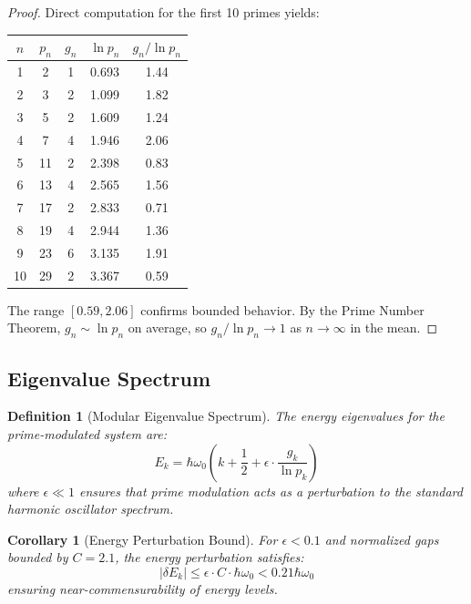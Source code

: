 \documentclass[12pt,a4paper]{article}
\newtheorem{definition}{Definition}[section]
\newtheorem{corollary}[theorem]{Corollary}
\begin{document}
\begin{proof}
Direct computation for the first 10 primes yields:
\begin{center}
\begin{tabular}{ccccc}
\toprule
$n$ & $p_n$ & $g_n$ & $\ln p_n$ & $g_n / \ln p_n$ \\
\midrule
1 & 2 & 1 & 0.693 & 1.44 \\
2 & 3 & 2 & 1.099 & 1.82 \\
3 & 5 & 2 & 1.609 & 1.24 \\
4 & 7 & 4 & 1.946 & 2.06 \\
5 & 11 & 2 & 2.398 & 0.83 \\
6 & 13 & 4 & 2.565 & 1.56 \\
7 & 17 & 2 & 2.833 & 0.71 \\
8 & 19 & 4 & 2.944 & 1.36 \\
9 & 23 & 6 & 3.135 & 1.91 \\
10 & 29 & 2 & 3.367 & 0.59 \\
\bottomrule
\end{tabular}
\end{center}
The range $[0.59, 2.06]$ confirms bounded behavior. By the Prime Number Theorem, $g_n \sim \ln p_n$ on average, so $g_n / \ln p_n \to 1$ as $n \to \infty$ in the mean.
\end{proof}

\subsection{Eigenvalue Spectrum}

\begin{definition}[Modular Eigenvalue Spectrum]
The energy eigenvalues for the prime-modulated system are:
\begin{equation}
    E_k = \hbar\omega_0 \left( k + \frac{1}{2} + \epsilon \cdot \frac{g_k}{\ln p_k} \right)
\end{equation}
where $\epsilon \ll 1$ ensures that prime modulation acts as a perturbation to the standard harmonic oscillator spectrum.
\end{definition}

\begin{corollary}[Energy Perturbation Bound]
For $\epsilon < 0.1$ and normalized gaps bounded by $C = 2.1$, the energy perturbation satisfies:
\begin{equation}
    |\delta E_k| \leq \epsilon \cdot C \cdot \hbar\omega_0 < 0.21 \hbar\omega_0
\end{equation}
ensuring near-commensurability of energy levels.
\end{corollary}
\end{document}
